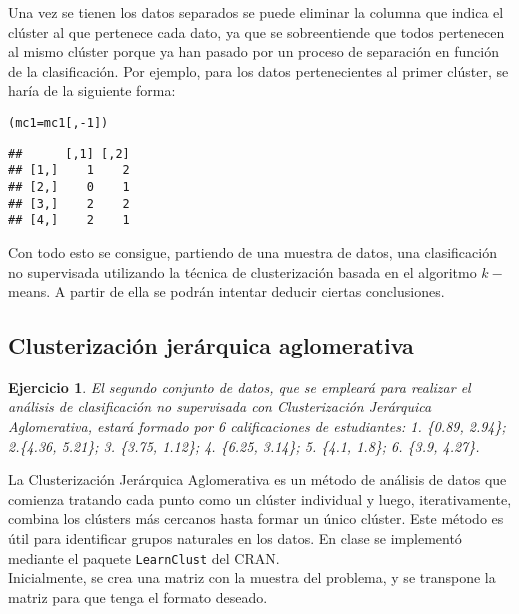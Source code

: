 \documentclass[12pt]{report}\usepackage[]{graphicx}\usepackage[dvipsnames]{xcolor}
\makeatletter
\newcommand{\hlnum}[1]{\textcolor[rgb]{0.686,0.059,0.569}{#1}}%
\newcommand{\hlopt}[1]{\textcolor[rgb]{0,0,0}{#1}}%
\newcommand{\hlstd}[1]{\textcolor[rgb]{0.345,0.345,0.345}{#1}}%
\newcommand{\hlkwb}[1]{\textcolor[rgb]{0.69,0.353,0.396}{#1}}%
\newenvironment{kframe}{%
 \def\at@end@of@kframe{}%
 \ifinner\ifhmode%
  \def\at@end@of@kframe{\end{minipage}}%
  \begin{minipage}{\columnwidth}%
 \fi\fi%
 \def\FrameCommand##1{\hskip\@totalleftmargin \hskip-\fboxsep
 \colorbox{shadecolor}{##1}\hskip-\fboxsep
     \hskip-\linewidth \hskip-\@totalleftmargin \hskip\columnwidth}%
 \MakeFramed {\advance\hsize-\width
   \@totalleftmargin\z@ \linewidth\hsize
   \@setminipage}}%
 {\par\unskip\endMakeFramed%
 \at@end@of@kframe}
\newenvironment{knitrout}{}{} %
\newtheorem{exercise}{Ejercicio}[section]
\makeatother
\begin{document}
				Una vez se tienen los datos separados se puede eliminar la columna que indica el clúster al que pertenece cada dato, ya que se sobreentiende que todos pertenecen al mismo clúster porque ya han pasado por un proceso de separación en función de la clasificación. Por ejemplo, para los datos pertenecientes al primer clúster, se haría de la siguiente forma:
				
\begin{knitrout}
\color{fgcolor}\begin{kframe}
\begin{alltt}
\hlstd{(mc1} \hlkwb{=} \hlstd{mc1[,}\hlopt{-}\hlnum{1}\hlstd{])}
\end{alltt}
\begin{verbatim}
##      [,1] [,2]
## [1,]    1    2
## [2,]    0    1
## [3,]    2    2
## [4,]    2    1
\end{verbatim}
\end{kframe}
\end{knitrout}
				
				Con todo esto se consigue, partiendo de una muestra de datos, una clasificación no supervisada utilizando la técnica de clusterización basada en el algoritmo $k-$means. A partir de ella se podrán intentar deducir ciertas conclusiones.
		
			\subsection{Clusterización jerárquica aglomerativa}
		
				\begin{exercise}
					El segundo conjunto de datos, que se empleará para realizar el análisis de clasificación no supervisada con Clusterización Jerárquica Aglomerativa, estará formado por 6 calificaciones de estudiantes: 1. \{0.89, 2.94\}; 2.\{4.36, 5.21\}; 3. \{3.75, 1.12\}; 4. \{6.25, 3.14\}; 5. \{4.1, 1.8\}; 6. \{3.9, 4.27\}.
				\end{exercise}
				
				La Clusterización Jerárquica Aglomerativa es un método de análisis de datos que comienza tratando cada punto como un clúster individual y luego, iterativamente, combina los clústers más cercanos hasta formar un único clúster. Este método es útil para identificar grupos naturales en los datos. En clase se implementó mediante el paquete \texttt{LearnClust} del CRAN.\\
				
				Inicialmente, se crea una matriz con la muestra del problema, y se transpone la matriz para que tenga el formato deseado.
				
\end{document}
